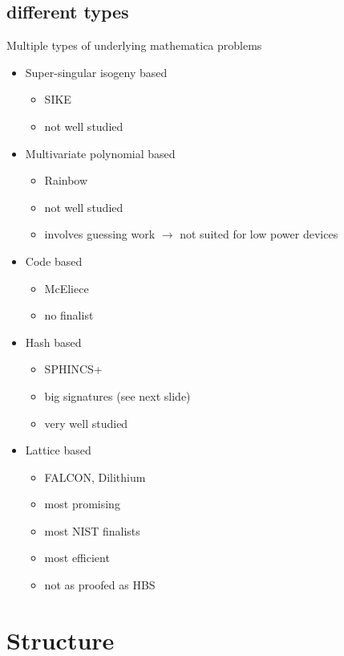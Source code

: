 \documentclass[ucs,10pt]{beamer}
\begin{document}
\subsection{different types}
\begin{frame}{Multiple types of underlying mathematica problems}

  \begin{itemize}
    \item Super-singular isogeny based
    \begin{itemize}
      \item SIKE
      \item not well studied
    \end{itemize}
    \item Multivariate polynomial based
    \begin{itemize}
      \item Rainbow
      \item not well studied
      \item involves guessing work $\rightarrow$ not suited for low power devices
    \end{itemize}
    \item Code based
    \begin{itemize}
      \item McEliece
      \item no finalist
    \end{itemize}
    \item Hash based
    \begin{itemize}
      \item SPHINCS+ 
      \item big signatures (see next slide)
      \item very well studied
    \end{itemize}
    \item Lattice based
    \begin{itemize}
      \item FALCON, Dilithium
      \item most promising
      \item most NIST finalists
      \item most efficient
      \item not as proofed as HBS
    \end{itemize}
  \end{itemize}
  

\end{frame}


\section{Structure}
\end{document}
